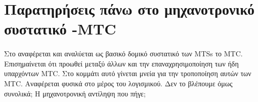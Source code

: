 \documentclass[a4paper,12pt,twoside]{article}
\begin{document}
	\tableofcontents
	
	\pagebreak
	
	\section{Παρατηρήσεις πάνω στο μηχανοτρονικό συστατικό -MTC}
		\paragraph{}{Στο \cite{TheMechatronicComponent:Thramboulidis2008} αναφέρεται και αναλύεται ως βασικό δομικό συστατικό των MTSs το MTC. Επισημαίνεται ότι προωθεί μεταξύ άλλων και την επαναχρησιμοποίηση των ήδη υπαρχόντων MTC. Στο κομμάτι αυτό γίνεται μνεία για την τροποποίηση αυτών των MTC. Αναφέρεται φυσικά στο μέρος του λογισμικού. Δεν το βλέπουμε όμως συνολικά; Η μηχανοτρονική αντίληψη που πήγε;
		}
		
	\cleardoublepage
	\label{κεφ.:Βιβλιογραφία}
	\printbibliography
\end{document}

